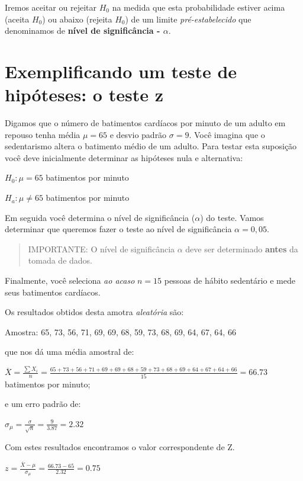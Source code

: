 \documentclass[
]{book}
\begin{document}
Iremos aceitar ou rejeitar \(H_0\) na medida que esta probabilidade estiver acima (aceita \(H_0\)) ou abaixo (rejeita \(H_0\)) de um limite \emph{pré-estabelecido} que denominamos de \textbf{nível de significância - \(\alpha\)}.

\hypertarget{exemplificando-um-teste-de-hipuxf3teses-o-teste-z}{%
\section{Exemplificando um teste de hipóteses: o teste z}\label{exemplificando-um-teste-de-hipuxf3teses-o-teste-z}}

Digamos que o número de batimentos cardíacos por minuto de um adulto em repouso tenha média \(\mu = 65\) e desvio padrão \(\sigma = 9\). Você imagina que o sedentarismo altera o batimento médio de um adulto. Para testar esta suposição você deve inicialmente determinar as hipóteses nula e alternativa:

\(H_0: \mu = 65\) batimentos por minuto

\(H_a: \mu \ne 65\) batimentos por minuto

Em seguida você determina o nível de significância (\(\alpha\)) do teste. Vamos determinar que queremos fazer o teste ao nível de significância \(\alpha = 0,05\).

\begin{quote}
IMPORTANTE: O nível de significância \(\alpha\) deve ser determinado \textbf{antes} da tomada de dados.
\end{quote}

Finalmente, você seleciona \emph{ao acaso} \(n = 15\) pessoas de hábito sedentário e mede seus batimentos cardíacos.

Os resultados obtidos desta amotra \emph{aleatória} são:

Amostra: 65, 73, 56, 71, 69, 69, 68, 59, 73, 68, 69, 64, 67, 64, 66

que nos dá uma média amostral de:

\(\overline{X} = \frac{\sum{X_i}}{n} = \frac{65+73+56+71+69+69+68+59+73+68+69+64+67+64+66}{15} = 66.73\) batimentos por minuto;

e um erro padrão de:

\(\sigma_{\mu} = \frac{\sigma}{\sqrt{n}} = \frac{9}{3.87} = 2.32\)

Com estes resultados encontramos o valor correspondente de Z.

\(z = \frac{\overline{X} - \mu}{\sigma_{\mu}} = \frac{66.73 - 65}{2.32} = 0.75\)
\end{document}
